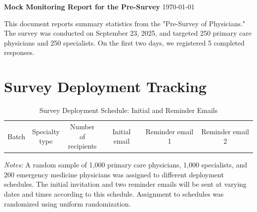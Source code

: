 \documentclass[11pt]{article}
\theoremstyle{definition}
\begin{document}
\singlespacing

\noindent

\begin{center}
\LARGE{\textbf{Mock Monitoring Report for the Pre-Survey}}
\break
\break
\today
\normalsize
\end{center}
\vspace{.8cm}

\vspace{.5cm}

\tableofcontents
\clearpage

This document reports summary statistics from the "Pre-Survey of Physicians." The survey was conducted on September 23, 2025, and targeted 250 primary care physicians and 250 specialists. On the first two days, we registered 5 completed responses. 

\clearpage

\section{Survey Deployment Tracking}

\begin{table}[H]
    \centering
    \caption{Survey Deployment Schedule: Initial and Reminder Emails}
    \begin{adjustbox}{width=1\linewidth} 
    \begin{tabular}{lccccccccccc} \toprule {Batch}&\shortstack{Specialty \\ type}&\shortstack{Number of \\ recipients}& \multicolumn{3}{c}{Initial email} & \multicolumn{3}{c}{Reminder email 1} & \multicolumn{3}{c}{Reminder email 2}  \\  \cmidrule(lr){4-6} \cmidrule(lr){7-9} \cmidrule(lr){10-12}  
    
    \end{tabular}
    \end{adjustbox}
    \label{tab:email_delivery}
          {\parbox{1\linewidth}{           %
		\scriptsize{{{ \textit{Notes:} A random sample of 1,000 primary care physicians, 1,000 specialists, and 200 emergency medicine physicians was assigned to different deployment schedules. The initial invitation and two reminder emails will be sent at varying dates and times according to this schedule. Assignment to schedules was randomized using uniform randomization.}}}}}
\end{table}
\end{document}
